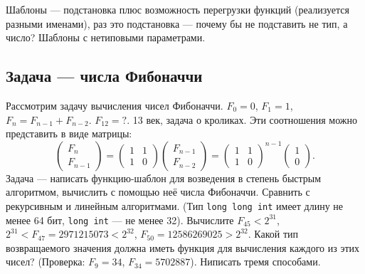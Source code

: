 \documentclass{book}
\begin{document}
Шаблоны --- подстановка плюс возможность перегрузки функций (реализуется разными именами), раз это
подстановка --- почему бы не подставить не тип, а число? Шаблоны с нетиповыми параметрами.

\subsection{Задача --- числа Фибоначчи}
Рассмотрим задачу вычисления чисел Фибоначчи. $F_0 = 0$, $F_1 = 1$, $F_n = F_{n-1} + F_{n-2}$.
$F_{12} = ?$.
13 век, задача о кроликах. Эти
соотношения можно представить в виде матрицы:
\begin{equation}
    \begin{pmatrix} F_n \\ F_{n-1} \end{pmatrix} = \begin{pmatrix} 1 & 1 \\ 1 & 0 \end{pmatrix}
    \begin{pmatrix} F_{n - 1} \\ F_{n - 2} \end{pmatrix} = \begin{pmatrix} 1 & 1 \\ 1 & 0
\end{pmatrix}^{n - 1} \begin{pmatrix} 1 \\ 0 \end{pmatrix}.
\end{equation}
Задача --- написать функцию-шаблон для возведения в степень быстрым алгоритмом, вычислить с помощью
неё числа Фибоначчи. Сравнить с рекурсивным и линейным алгоритмами. (Тип
\texttt{long long int} имеет длину не менее 64 бит, \texttt{long int} --- не
менее 32). Вычислите $F_{45} < 2^{31}$, $2^{31} < F_{47} = 2971215073 < 2^{32}$, $F_{50} =
12586269025 > 2^{32}$.  Какой тип возвращаемого значения должна иметь функция для вычисления
каждого из этих чисел?  (Проверка: $F_{9} = 34$, $F_{34} = 5702887$). Ниписать тремя способами.
\end{document}
